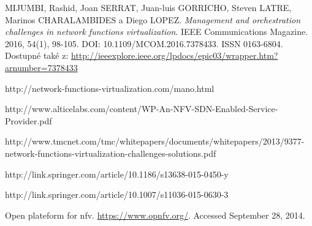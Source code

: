 \begin{thebibliography}{10}
MIJUMBI, Rashid, Joan SERRAT, Juan-luis GORRICHO, Steven LATRE, Marinos CHARALAMBIDES a Diego LOPEZ. \emph{Management and orchestration challenges in network functions virtualization}. IEEE Communications Magazine. 2016, 54(1), 98-105. DOI: 10.1109/MCOM.2016.7378433. ISSN 0163-6804. Dostupné také z: \url{http://ieeexplore.ieee.org/lpdocs/epic03/wrapper.htm?arnumber=7378433}

http://network-functions-virtualization.com/mano.html

http://www.alticelabs.com/content/WP-An-NFV-SDN-Enabled-Service-Provider.pdf

http://www.tmcnet.com/tmc/whitepapers/documents/whitepapers/2013/9377-network-functions-virtualization-challenges-solutions.pdf

http://link.springer.com/article/10.1186/s13638-015-0450-y

http://link.springer.com/article/10.1007/s11036-015-0630-3

Open plateform for nfv. \url{https://www.opnfv.org/}.  Accessed September 28,
2014.
\end{thebibliography}